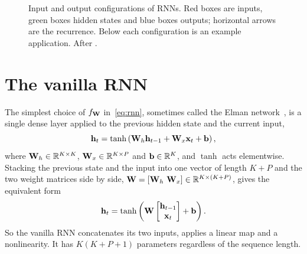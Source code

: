 \begin{figure}[t]
  \caption{Input and output configurations of RNNs. Red boxes are inputs, green boxes hidden states and blue boxes outputs; horizontal arrows are the recurrence. Below each configuration is an example application. After \citet{karpathy2015}.}
  \label{fig:configs}
\end{figure}

\section{The vanilla RNN}
\label{sec:vanilla}

The simplest choice of $f_{\mathbf{W}}$ in~\eqref{eq:rnn}, sometimes called the Elman network~\citep{elman1990}, is a single dense layer applied to the previous hidden state and the current input,
\begin{equation}
  \mathbf{h}_t = \tanh\left(\mathbf{W}_h\mathbf{h}_{t-1} + \mathbf{W}_x\mathbf{x}_t + \mathbf{b}\right),
  \label{eq:vanilla}
\end{equation}
where $\mathbf{W}_h\in\mathbb{R}^{K\times K}$, $\mathbf{W}_x\in\mathbb{R}^{K\times P}$ and $\mathbf{b}\in\mathbb{R}^K$, and $\tanh$ acts elementwise. Stacking the previous state and the input into one vector of length $K+P$ and the two weight matrices side by side, $\mathbf{W}=[\mathbf{W}_h\ \mathbf{W}_x]\in\mathbb{R}^{K\times(K+P)}$, gives the equivalent form
\begin{equation}
  \mathbf{h}_t = \tanh\left(\mathbf{W}\begin{bmatrix}\mathbf{h}_{t-1}\\\mathbf{x}_t\end{bmatrix} + \mathbf{b}\right).
\end{equation}
So the vanilla RNN concatenates its two inputs, applies a linear map and a nonlinearity. It has $K(K+P+1)$ parameters regardless of the sequence length.

